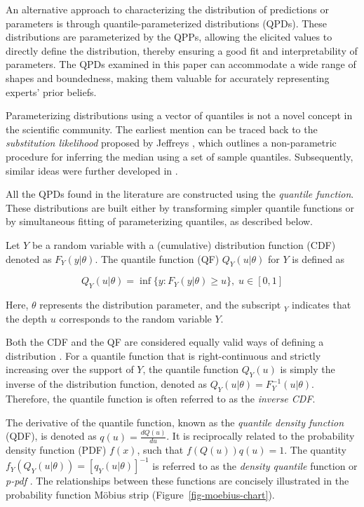 \documentclass[
  fleqn,
  deca,
  blindrev
]{informs4}
\begin{document}
An alternative approach to characterizing the distribution of
predictions or parameters is through quantile-parameterized
distributions (QPDs). These distributions are parameterized by the QPPs,
allowing the elicited values to directly define the distribution,
thereby ensuring a good fit and interpretability of parameters. The QPDs
examined in this paper can accommodate a wide range of shapes and
boundedness, making them valuable for accurately representing experts'
prior beliefs.

Parameterizing distributions using a vector of quantiles is not a novel
concept in the scientific community. The earliest mention can be traced
back to the \emph{substitution likelihood} proposed by Jeffreys
\citep{jeffreys1939TheoryProbability}, which outlines a non-parametric
procedure for inferring the median using a set of sample quantiles.
Subsequently, similar ideas were further developed in
\citep{boos1986BootstrapMethodsUsing, lavine1995ApproximateLikelihoodQuantiles, dunson2005ApproximateBayesianInference}.

All the QPDs found in the literature are constructed using the
\emph{quantile function}. These distributions are built either by
transforming simpler quantile functions or by simultaneous fitting of
parameterizing quantiles, as described below.

Let \(Y\) be a random variable with a (cumulative) distribution function
(CDF) denoted as \(F_Y(y\vert\theta)\). The quantile function (QF)
\(Q_Y(u\vert\theta)\) for \(Y\) is defined as

\[
Q_Y(u\vert\theta)=\inf\{y:F_Y(y\vert\theta)\geq u\}, \; u\in[0,1]
\]

Here, \(\theta\) represents the distribution parameter, and the
subscript \(_Y\) indicates that the depth \(u\) corresponds to the
random variable \(Y\).

Both the CDF and the QF are considered equally valid ways of defining a
distribution \citep{tukey1965WhichPartSample}. For a quantile function
that is right-continuous and strictly increasing over the support of
\(Y\), the quantile function \(Q_Y(u)\) is simply the inverse of the
distribution function, denoted as
\(Q_Y(u\vert\theta)=F_Y^{-1}(u\vert\theta)\). Therefore, the quantile
function is often referred to as the \emph{inverse CDF}.

The derivative of the quantile function, known as the \emph{quantile
density function} (QDF), is denoted as \(q(u) = \frac{dQ(u)}{du}\). It
is reciprocally related to the probability density function (PDF)
\(f(x)\), such that \(f(Q(u))q(u) = 1\). The quantity
\(f_Y(Q_Y(u\vert\theta))=[q_Y(u\vert\theta)]^{-1}\) is referred to as
the \emph{density quantile} function
\citep{parzen1979NonparametricStatisticalData} or \emph{p-pdf}
\citep{gilchrist2000StatisticalModellingQuantile}. The relationships
between these functions are concisely illustrated in the probability
function Möbius strip (Figure~\ref{fig-moebius-chart}).
\end{document}
